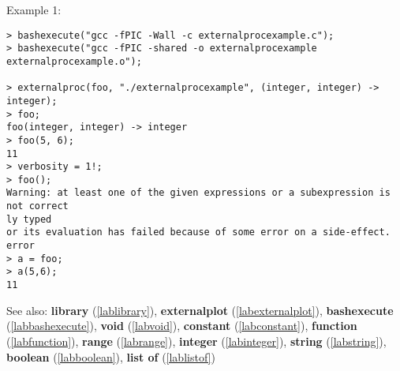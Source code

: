 \noindent Example 1: 
\begin{center}\begin{minipage}{15cm}\begin{Verbatim}[frame=single]
> bashexecute("gcc -fPIC -Wall -c externalprocexample.c");
> bashexecute("gcc -fPIC -shared -o externalprocexample externalprocexample.o");

> externalproc(foo, "./externalprocexample", (integer, integer) -> integer);
> foo;
foo(integer, integer) -> integer
> foo(5, 6);
11
> verbosity = 1!;
> foo();
Warning: at least one of the given expressions or a subexpression is not correct
ly typed
or its evaluation has failed because of some error on a side-effect.
error
> a = foo;
> a(5,6);
11
\end{Verbatim}
\end{minipage}\end{center}
See also: \textbf{library} (\ref{lablibrary}), \textbf{externalplot} (\ref{labexternalplot}), \textbf{bashexecute} (\ref{labbashexecute}), \textbf{void} (\ref{labvoid}), \textbf{constant} (\ref{labconstant}), \textbf{function} (\ref{labfunction}), \textbf{range} (\ref{labrange}), \textbf{integer} (\ref{labinteger}), \textbf{string} (\ref{labstring}), \textbf{boolean} (\ref{labboolean}), \textbf{list of} (\ref{lablistof})

